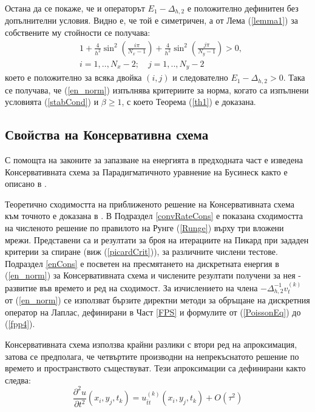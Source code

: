 \documentclass[a4paper]{article}
\newcommand{\be}{\begin{equation}}
\newcommand{\ee}{\end{equation}}
\newcommand{\rf}[1]{(\ref{#1})}
\theoremstyle{remark}
\begin{document}
\begin{large}
Остана да се покаже, че и операторът $E_1 - \Delta_{h, 2}$ е положително дефинитен без допълнителни условия. Видно е, че той е симетричен, а от Лема \rf{lemma1} за собствените му стойности се получава:
\begin{align}
&1+ \frac{4}{h^2}\sin^2(\frac{i \pi}{N_x-1}) + \frac{4}{h^2}\sin^2(\frac{j \pi}{N_y-1}) >0, \nonumber\\
&i = 1,..,N_x-2; \quad j = 1, .. , N_y-2 \nonumber
\end{align}
което е положително за всяка двойка $(i, j)$ и следователно $E_1 - \Delta_{h, 2} > 0$. Така се получава, че \rf{en_norm} изпълнява критериите за норма, когато са изпълнени условията \rf{stabCond} и $\beta \ge 1$, с което Теорема \rf{th1} е доказана.

\subsection{ Свойства на Консервативна схема}\label{consSchemeHead}
С помощта на законите за запазване на енергията в предходната част е изведена Консервативната схема за Парадигматичното уравнение на Бусинеск както е описано в \cite{ref25, ref999, ref1000}.

Теоретично сходимостта на приближеното решение на Консервативната схема към точното е доказана в \cite{ref999, ref1000}. В Подраздел \ref{convRateCons} е показана сходимостта на численото решение по правилото на Рунге \rf{Runge} върху три вложени мрежи. Представени са и резултати за броя на итерациите на Пикард при зададен критерии за спиране (виж \rf{picardCrit}), за различните числени тестове. Подраздел \ref{enCons} е посветен на пресмятането на дискретната енергия в \rf{en_norm} за Консервативната схема и числените резултати получени за нея - развитие във времето и ред на сходимост. За изчислението на члена $-\Delta_{h,2}^{-1}v_{t}^{(k)}$ от \rf{en_norm} се използват бързите директни методи за обръщане на дискретния оператор на Лаплас, дефинирани в Част \ref{FPS} и формулите от \rf{PoissonEq} до \rf{fpp4}.

Консервативната схема използва крайни разлики с втори ред на апроксимация, затова се предполага, че четвъртите производни на непрекъснатото решение по времето и пространството съществуват. Тези апроксимации са дефинирани както следва:
\be\label{difft}
\frac{\partial^2 u}{\partial t^2}(x_i, y_j, t_k ) = u^{(k)}_{\bar{t}t}(x_i, y_j, t_k ) + O(\tau^2) 
\ee


\end{large}
\end{document}
